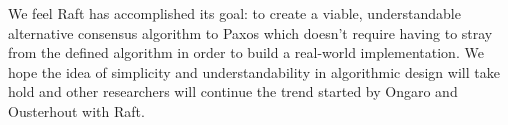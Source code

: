 We feel Raft has accomplished its goal: to create a viable, understandable alternative consensus algorithm to Paxos which doesn't require having to stray from the defined algorithm in order to build a real-world implementation.  We hope the idea of simplicity and understandability in algorithmic design will take hold and other researchers will continue the trend started by Ongaro and Ousterhout with Raft.



\newpage







\appendix

%








